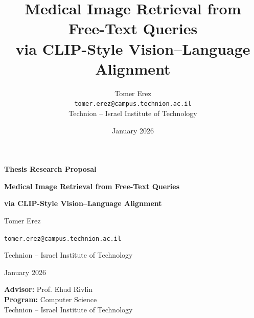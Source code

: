 \documentclass[11pt,a4paper]{article}
\title{Medical Image Retrieval from Free-Text Queries\\
via CLIP-Style Vision--Language Alignment}
\author{
Tomer Erez\\
\texttt{tomer.erez@campus.technion.ac.il}\\[6pt]
Technion -- Israel Institute of Technology
}
\date{January 2026}
\begin{document}
\begin{titlepage}
    \centering
    \vspace*{1.2in}

    {\LARGE \textbf{Thesis Research Proposal}}\par
    \vspace{0.25in}
    {\Huge \textbf{Medical Image Retrieval from Free-Text Queries}}\par
    \vspace{0.15in}
    {\Large \textbf{via CLIP-Style Vision--Language Alignment}}\par

    \vspace{0.8in}

    {\Large Tomer Erez}\par
    \vspace{0.1in}
    {\large \texttt{tomer.erez@campus.technion.ac.il}}\par

    \vspace{0.35in}

    {\large Technion -- Israel Institute of Technology}\par
    \vspace{0.08in}
    {\large January 2026}\par

    \vfill

    \begin{flushleft}
    \textbf{Advisor:} Prof. Ehud Rivlin\\
    \textbf{Program:} Computer Science\\
    Technion -- Israel Institute of Technology
    \end{flushleft}

\end{titlepage}
\end{document}
